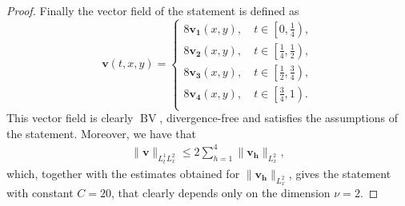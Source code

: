 \documentclass[10pt,a4paper]{amsart}
\DeclareMathOperator{\BV}{BV}
\begin{document}
\begin{proof}
        Finally the vector field of the statement is defined as 
         \begin{equation*}
     \mathbf v(t,x,y)=\begin{cases}
         8 \mathbf{v_1}(x,y), \quad t\in\left[0,\frac{1}{4}\right), \\
         8 \mathbf{v_2}(x,y), \quad 
  t\in\left[\frac{1}{4},\frac{1}{2}\right), \\
         8 \mathbf{v_3}(x,y), \quad t\in\left[\frac{1}{2},\frac{3}{4}\right), \\
         8 \mathbf{v_4}(x,y), \quad t\in\left[\frac{3}{4},1\right).\\
     \end{cases}
 \end{equation*}
        This vector field is clearly $\BV$, divergence-free and satisfies the assumptions of the statement. Moreover, we have that
        \begin{align*}
             \|\mathbf v\|_{L^1_tL^2_x}\leq 2\sum_{h=1}^4\|\mathbf{v_h}\|_{L^2_x},
        \end{align*}
        which, together with the estimates obtained for $\|\mathbf{v_h}\|_{L^2_x}$, gives the statement with constant $C=20$, that clearly depends only on the dimension $\nu=2$. 
\end{proof}
\end{document}
